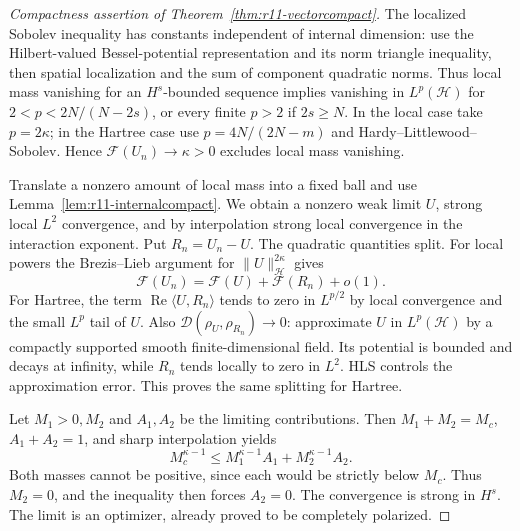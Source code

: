\begin{proof}[Compactness assertion of Theorem~\ref{thm:r11-vectorcompact}]
The localized Sobolev inequality has constants independent of internal
dimension: use the Hilbert-valued Bessel-potential representation and
its norm triangle inequality, then spatial localization and the sum of
component quadratic norms. Thus local mass vanishing for an
$H^s$-bounded sequence implies vanishing in $L^p(\mathcal H)$ for
$2<p<2N/(N-2s)$, or every finite $p>2$ if $2s\ge N$.
In the local case take $p=2\kappa$; in the Hartree case use
$p=4N/(2N-m)$ and Hardy--Littlewood--Sobolev. Hence
$\mathcal F(U_n)\to\kappa>0$ excludes local mass vanishing.

Translate a nonzero amount of local mass into a fixed ball and use
Lemma~\ref{lem:r11-internalcompact}. We obtain a nonzero weak limit
$U$, strong local $L^2$ convergence, and by interpolation strong local
convergence in the interaction exponent. Put $R_n=U_n-U$.
The quadratic quantities split. For local powers the Brezis--Lieb
argument for $\|U\|_{\mathcal H}^{2\kappa}$ gives
\[
 \mathcal F(U_n)=\mathcal F(U)+\mathcal F(R_n)+o(1).
\]
For Hartree, the term $\operatorname{Re}\langle U,R_n\rangle$
tends to zero in $L^{p/2}$ by local convergence and the small
$L^p$ tail of $U$. Also
$\mathcal D(\rho_U,\rho_{R_n})\to0$: approximate $U$ in
$L^p(\mathcal H)$ by a compactly supported smooth finite-dimensional
field. Its potential is bounded and decays at infinity, while $R_n$
tends locally to zero in $L^2$. HLS controls the approximation error.
This proves the same splitting for Hartree.

Let $M_1>0,M_2$ and $A_1,A_2$ be the limiting contributions.
Then $M_1+M_2=M_c$, $A_1+A_2=1$, and sharp interpolation yields
\[
 M_c^{\kappa-1}\le
 M_1^{\kappa-1}A_1+M_2^{\kappa-1}A_2.
\]
Both masses cannot be positive, since each would be strictly below
$M_c$. Thus $M_2=0$, and the inequality then forces $A_2=0$.
The convergence is strong in $H^s$. The limit is an optimizer,
already proved to be completely polarized.
\end{proof}

